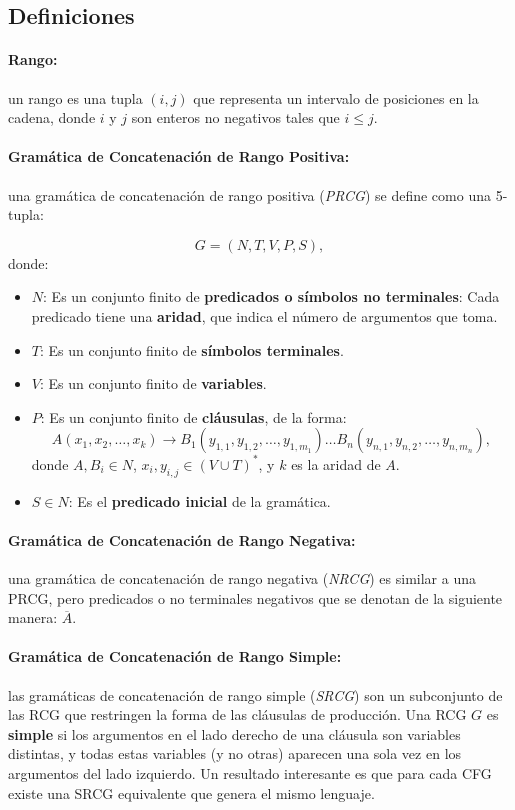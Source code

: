 \subsection{Definiciones}

\paragraph{Rango:} un rango es una tupla $(i, j)$ que representa un intervalo de posiciones en la cadena, donde $i$ y $j$ son enteros no negativos tales que $i \leq j$.

\paragraph{Gramática de Concatenación de Rango Positiva:} una gramática de concatenación de rango positiva (\textit{PRCG}) se define como una 5-tupla:

\[
    G = (N, T, V, P, S),
\]
donde:

\begin{itemize}
    \item $N$: Es un conjunto finito de \textbf{predicados o símbolos no terminales}: Cada predicado tiene una \textbf{aridad}, que indica el número de argumentos que toma.
    \item $T$: Es un conjunto finito de \textbf{símbolos terminales}.
    \item $V$: Es un conjunto finito de \textbf{variables}.
    \item $P$: Es un conjunto finito de \textbf{cláusulas}, de la forma:
          \[
              A(x_1, x_2, \ldots, x_k) \to B_1(y_{1,1}, y_{1,2}, \ldots, y_{1,m_1}) \ldots B_n(y_{n,1}, y_{n,2}, \ldots, y_{n,m_n}),
          \]
          donde $A, B_i \in N$, $x_i, y_{i,j} \in (V \cup T)^*$, y $k$ es la aridad de $A$.
    \item $S \in N$: Es el \textbf{predicado inicial} de la gramática.
\end{itemize}

\paragraph{Gramática de Concatenación de Rango Negativa:} una gramática de concatenación de rango negativa (\textit{NRCG}) es similar a una PRCG, pero predicados o no terminales negativos que se denotan de la siguiente manera: $\overline{A}$.

\paragraph{Gramática de Concatenación de Rango Simple:} las gramáticas de concatenación de rango simple (\textit{SRCG}) son un subconjunto de las RCG que restringen la forma de las cláusulas de producción.
Una RCG $G$ es \textbf{simple} si los argumentos en el lado derecho de una cláusula son variables distintas, y todas estas variables (y no otras) aparecen una sola vez en los argumentos del lado izquierdo.
Un resultado interesante es que para cada CFG existe una SRCG equivalente que genera el mismo lenguaje.

